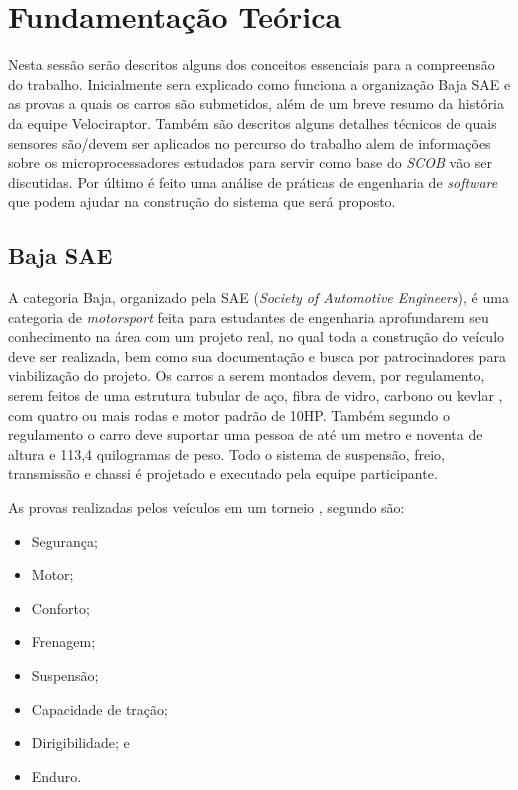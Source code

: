 \chapter{Fundamentação Teórica}
	\label{ch:fundamentacao}
Nesta sessão serão descritos alguns dos conceitos essenciais para a compreensão do trabalho. Inicialmente sera explicado como funciona a organização Baja SAE e as provas a quais os carros são submetidos, além de um breve resumo da história da equipe Velociraptor. Também são descritos alguns detalhes técnicos de quais sensores são/devem ser aplicados no percurso do trabalho alem de informações sobre os microprocessadores estudados para servir como base do \textit{SCOB} vão ser discutidas. Por último é feito uma análise de práticas de engenharia de \textit{software} que podem ajudar na construção do sistema que será proposto.

\section{Baja SAE}
A categoria Baja, organizado pela SAE (\textit{Society of Automotive Engineers}), é uma categoria de \textit{motorsport} feita para estudantes de engenharia aprofundarem seu conhecimento na área com um projeto real, no qual toda a construção do veículo deve ser realizada, bem como sua documentação e busca por patrocinadores para viabilização do projeto. Os carros a serem montados devem, por regulamento, \cite{regulamentobajasae} serem feitos de uma estrutura tubular de aço, fibra de vidro, carbono ou kevlar \cite{projetoMiniBaja2006}, com quatro ou mais rodas e motor padrão de 10HP. Também segundo o regulamento o carro deve suportar uma pessoa de até um metro e noventa de altura e 113,4 quilogramas de peso. Todo o sistema de suspensão, freio, transmissão e chassi é projetado e executado pela equipe participante.  

As provas realizadas pelos veículos em um torneio , segundo \cite{bajasae} são:
\begin{itemize}
	\item Segurança;
	\item Motor;
	\item Conforto;
	\item Frenagem;
	\item Suspensão;
	\item Capacidade de tração;
	\item Dirigibilidade; e
	\item Enduro.
\end{itemize}

